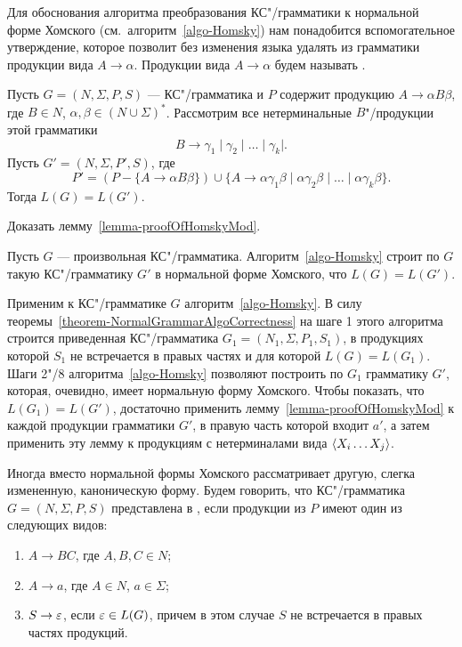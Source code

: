 Для обоснования алгоритма преобразования КС"/грамматики к нормальной форме Хом\-ско\-го (см.~алгоритм~\ref{algo-Homsky}) нам понадобится вспомогательное утверждение, которое позволит без изменения языка удалять из грамматики продукции вида $A\to\alpha$. Продукции вида $A\to\alpha$ будем называть .

\begin{mylemma}
\label{lemma-proofOfHomskyMod}
Пусть $G=(N,\Sigma,P,S)$ --- КС"/грамматика и $P$ содержит продукцию $A\to\alpha B\beta$, где $B\in N$, $\alpha,\beta\in(N\cup\Sigma)^*$. Рассмотрим все нетерминальные $B$"/про\-дук\-ции этой грамматики
\[
    B \to \gamma_1 \mid \gamma_2 \mid \ldots \mid \gamma_k |.
\]
Пусть $G'=(N,\Sigma,P',S)$, где
\[
    P' = (P - \{A\to\alpha B\beta\}) \cup
        \{A \to \alpha\gamma_1\beta
            \mid \alpha\gamma_2\beta
            \mid \ldots
            \mid \alpha\gamma_k\beta\}.
\]
Тогда $L(G)=L(G')$.
\end{mylemma}

\begin{myproblem}
Доказать лемму~\ref{lemma-proofOfHomskyMod}.
\end{myproblem}

\begin{mytheorem}
\label{theorem-AlgoHomskyProof}
Пусть $G$ --- произвольная КС"/грамматика. Алгоритм~\ref{algo-Homsky} строит по $G$ такую КС"/грамматику $G'$ в нормальной форме Хомского, что $L(G)=L(G')$.
\end{mytheorem}

\begin{myproof}
Применим к КС"/грамматике $G$ алгоритм~\ref{algo-Homsky}. В силу теоремы~\ref{theorem-NormalGrammarAlgoCorrectness} на шаге 1 этого алгоритма строится приведенная КС"/грамматика $G_1=(N_1,\Sigma, P_1, S_1)$, в продукциях которой $S_1$ не встречается в правых частях и для которой $L(G)=L(G_1)$. Шаги 2"/8 алгоритма~\ref{algo-Homsky} позволяют построить по $G_1$ грамматику $G'$, которая, очевидно, имеет нормальную форму Хомского. Чтобы показать, что $L(G_1)=L(G')$, достаточно применить лемму~\ref{lemma-proofOfHomskyMod} к каждой продукции грамматики $G'$, в правую часть которой входит $a'$, а затем применить эту лемму к продукциям с нетерминалами вида $\langle X_i\ldots X_j \rangle$.
\end{myproof}

Иногда вместо нормальной формы Хомского рассматривает другую, слегка
измененную, каноническую форму. Будем говорить, что КС"/грамматика
$G=(N,\Sigma,P,S)$ представлена в , если продукции из $P$ имеют один из следующих видов:
\begin{enumerate}
    \item $A\to BC$, где $A,B,C\in N$;
    \item $A\to a$, где $A\in N$, $a\in\Sigma$;
    \item $S\to\varepsilon$, если $\varepsilon\in L(G)$, причем в этом случае
    $S$ не встречается в правых частях продукций.
\end{enumerate}


